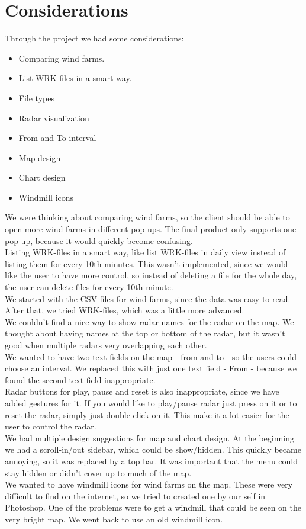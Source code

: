\chapter{Considerations}
Through the project we had some considerations:
\begin{itemize}
\item Comparing wind farms.
\item List WRK-files in a smart way.
\item File types
\item Radar visualization
\item From and To interval
\item Map design
\item Chart design
\item Windmill icons
\end{itemize}
We were thinking about comparing wind farms, so the client should be able to open more wind farms in different pop ups. The final product only supports one pop up, because it would quickly become confusing.\\
Listing WRK-files in a smart way, like list WRK-files in daily view instead of listing them for every 10th minutes. This wasn't implemented, since we would like the user to have more control, so instead of deleting a file for the whole day, the user can delete files for every 10th minute.\\
We started with the CSV-files for wind farms, since the data was easy to read. After that, we tried WRK-files, which was a little more advanced.\\
We couldn't find a nice way to show radar names for the radar on the map. We thought about having names at the top or bottom of the radar, but it wasn't good when multiple radars very overlapping each other.\\
We wanted to have two text fields on the map - from and to - so the users could choose an interval. We replaced this with just one text field - From - because we found the second text field inappropriate.\\
Radar buttons for play, pause and reset is also inappropriate, since we have added gestures for it. If you would like to play/pause radar just press on it or to reset the radar, simply just double click on it. This make it a lot easier for the user to control the radar.\\
We had multiple design suggestions for map and chart design. At the beginning we had a scroll-in/out sidebar, which could be show/hidden. This quickly became annoying, so it was replaced by a top bar. It was important that the menu could stay hidden or didn't cover up to much of the map.\\
We wanted to have windmill icons for wind farms on the map. These were very difficult to find on the internet, so we tried to created one by our self in Photoshop. One of the problems were to get a windmill that could be seen on the very bright map. We went back to use an old windmill icon.\\

